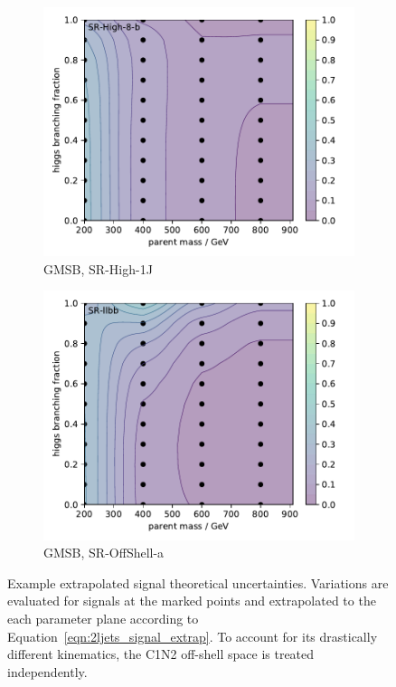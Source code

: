 \begin{figure}[tp]
\begin{subfigure}{0.48\textwidth}
\centering
\includegraphics[width=\textwidth]{figures/2ljets_signal_sys_gmsb_SRHigh8_2.pdf}
\caption{GMSB, SR-High-1J}
\end{subfigure}
\hfill
\begin{subfigure}{0.48\textwidth}
\centering
\includegraphics[width=\textwidth]{figures/2ljets_signal_sys_gmsb_SRllbb.pdf}
\caption{GMSB, SR-OffShell-a}
\end{subfigure}
\caption[
Example extrapolated signal theoretical uncertainties
]{%
Example extrapolated signal theoretical uncertainties.
Variations are evaluated for signals at the marked points and extrapolated to
the each parameter plane according to Equation~\ref{eqn:2ljets_signal_extrap}.
To account for its drastically different kinematics, the C1N2 off-shell space
is treated independently.
}
\label{fig:2ljets_signal_sys_extrap}
\end{figure}

